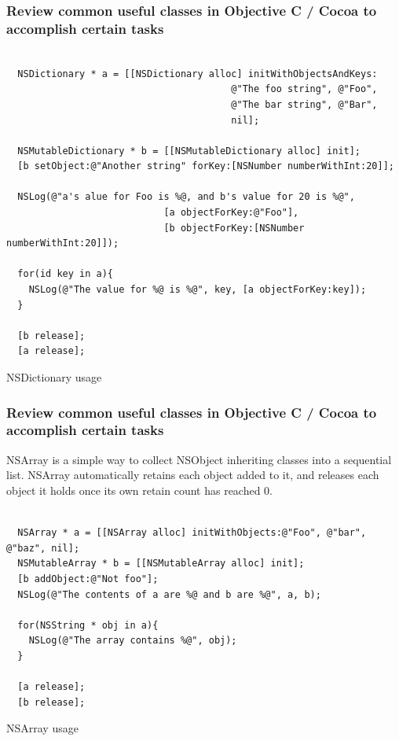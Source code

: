 \documentclass[10pt]{beamer}
\begin{document}
\begin{frame}[fragile]
  \frametitle{Review common useful classes in Objective C / Cocoa to accomplish certain tasks}
  \begin{listing}[H]
    \begin{verbatim}

  NSDictionary * a = [[NSDictionary alloc] initWithObjectsAndKeys:
                                        @"The foo string", @"Foo",
                                        @"The bar string", @"Bar",
                                        nil];

  NSMutableDictionary * b = [[NSMutableDictionary alloc] init];
  [b setObject:@"Another string" forKey:[NSNumber numberWithInt:20]];

  NSLog(@"a's alue for Foo is %@, and b's value for 20 is %@",
                            [a objectForKey:@"Foo"],
                            [b objectForKey:[NSNumber numberWithInt:20]]);

  for(id key in a){
    NSLog(@"The value for %@ is %@", key, [a objectForKey:key]);
  }

  [b release];
  [a release];

  \end{verbatim}
    \caption{NSDictionary usage}
    \label{listing:22}
  \end{listing}

\end{frame}

\begin{frame}[fragile]
  \frametitle{Review common useful classes in Objective C / Cocoa to accomplish certain tasks}
  NSArray is a simple way to collect NSObject inheriting classes into a sequential list.  NSArray automatically retains each object added to it, and releases each object it holds once its own retain count has reached 0.
\begin{listing}[H]
    \begin{verbatim}

  NSArray * a = [[NSArray alloc] initWithObjects:@"Foo", @"bar", @"baz", nil];
  NSMutableArray * b = [[NSMutableArray alloc] init];
  [b addObject:@"Not foo"];
  NSLog(@"The contents of a are %@ and b are %@", a, b);

  for(NSString * obj in a){
    NSLog(@"The array contains %@", obj);
  }

  [a release];
  [b release];

  \end{verbatim}
    \caption{NSArray usage}
    \label{listing:23}
  \end{listing}

\end{frame}
\end{document}
